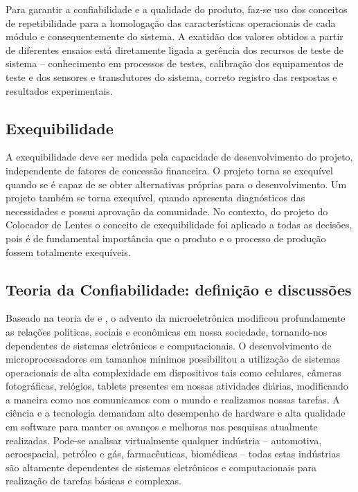 \begin{anexosenv}
Para garantir a confiabilidade e a qualidade do produto, faz-se uso dos conceitos de repetibilidade para a homologação das características operacionais de cada módulo e consequentemente do sistema. A exatidão dos valores obtidos a partir de diferentes ensaios está diretamente ligada a gerência dos recursos de teste de sistema – conhecimento em processos de testes, calibração dos equipamentos de teste e dos sensores e transdutores do sistema, correto registro das respostas e resultados experimentais.

\subsection[Exequibilidade]{Exequibilidade}

A exequibilidade deve ser medida pela capacidade de desenvolvimento do projeto, independente de fatores de concessão financeira. O projeto torna se exequível quando se é capaz de se obter alternativas próprias para o desenvolvimento. Um projeto também se torna exequível, quando apresenta diagnósticos das necessidades e possui aprovação da comunidade. No contexto, do projeto do Colocador de Lentes o conceito de exequibilidade foi aplicado a todas as decisões, pois é de fundamental importância que o produto e o processo de produção fossem totalmente exequíveis.

\subsection[Teoria da Confiabilidade: definição e discussões]{Teoria da Confiabilidade: definição e discussões}

Baseado na teoria de  e , o advento da microeletrônica modificou profundamente as relações politicas, sociais e econômicas em nossa sociedade, tornando-nos dependentes de sistemas eletrônicos e computacionais. O desenvolvimento de microprocessadores em tamanhos mínimos possibilitou a utilização de sistemas operacionais de alta complexidade em dispositivos tais como celulares, câmeras fotográficas, relógios, tablets presentes em nossas atividades diárias, modificando a maneira como nos comunicamos com o mundo e realizamos nossas tarefas. A ciência e a tecnologia demandam alto desempenho de hardware e alta qualidade em software para manter os avanços e melhoras nas pesquisas atualmente realizadas. Pode-se analisar virtualmente qualquer indústria – automotiva, aeroespacial, petróleo e gás, farmacêuticas, biomédicas – todas estas indústrias são altamente dependentes de sistemas eletrônicos e computacionais para realização de tarefas básicas e complexas.


\end{anexosenv}
